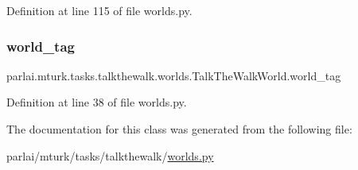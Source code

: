 Definition at line 115 of file worlds.\+py.

\mbox{\label{classparlai_1_1mturk_1_1tasks_1_1talkthewalk_1_1worlds_1_1TalkTheWalkWorld_a0531d81b112ac673ed497218282687c8}} 
\subsubsection{\texorpdfstring{world\+\_\+tag}{world\_tag}}
{\footnotesize\ttfamily parlai.\+mturk.\+tasks.\+talkthewalk.\+worlds.\+Talk\+The\+Walk\+World.\+world\+\_\+tag}



Definition at line 38 of file worlds.\+py.



The documentation for this class was generated from the following file\+:\begin{DoxyCompactItemize}
\item 
parlai/mturk/tasks/talkthewalk/\hyperlink{parlai_2mturk_2tasks_2talkthewalk_2worlds_8py}{worlds.\+py}\end{DoxyCompactItemize}
